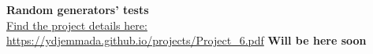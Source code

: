 \question
{\center \bf Random generators' tests\\}
\href{https://ydjemmada.github.io/projects/Project\_6.pdf}{Find the project details here: https://ydjemmada.github.io/projects/Project\_6.pdf}
\question
{\center \bf Will be here soon\\}
